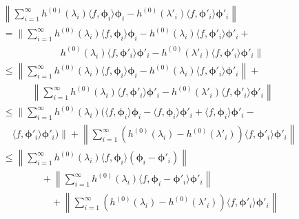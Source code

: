 \begin{align}
 & \nonumber \left\| \sum_{i=1}^\infty h^{(0)}(\lambda_{i}) \langle f, \bm\phi_i \rangle \bm\phi_i  -  h^{(0)}(\lambda'_i )  \langle f, \bm\phi'_i \rangle \bm\phi'_i \right\|  \\
 &\nonumber =\Bigg\|\sum_{i=1}^\infty  h^{(0)}(\lambda_{i}) \langle f, \bm\phi_i \rangle \bm\phi_i -  h^{(0)}(\lambda_{i}) \langle f, \bm\phi'_i \rangle \bm\phi'_i  + \\
 &\qquad \qquad \qquad h^{(0)}(\lambda_{i}) \langle f, \bm\phi'_i \rangle \bm\phi'_i- h^{(0)}(\lambda'_{i}) \langle f, \bm\phi'_i \rangle \bm\phi'_i \Bigg\| \\
  & \nonumber \leq \left\|\sum_{i=1}^\infty  h^{(0)}(\lambda_i)  \langle f, \bm\phi_i \rangle \bm\phi_i -  h^{(0)}(\lambda_i ) \langle f, \bm\phi'_i \rangle \bm\phi'_i\right\|  +\\
  &\qquad\quad  \left\|\sum_{i =1}^\infty h^{(0)}(\lambda_{i}) \langle f, \bm\phi'_i \rangle \bm\phi'_i -  h^{(0)}(\lambda'_{i}) \langle f, \bm\phi'_i \rangle \bm\phi'_i \right\| \\
    &\nonumber \leq \Bigg\| \sum_{i=1}^\infty  h^{(0)}(\lambda_i)\Bigg( \langle f, \bm\phi_i \rangle\bm\phi_i-\langle f, \bm\phi_i \rangle\bm\phi'_i +\langle f, \bm\phi_i \rangle\bm\phi'_i - \\
    &\quad \langle f, \bm\phi'_i \rangle \bm\phi'_i \Bigg) \Bigg\| +\left\|\sum_{i =1}^\infty  (h^{(0)}(\lambda_i ) -h^{(0)}(\lambda'_i) ) \langle f, \bm\phi'_i \rangle \bm\phi'_i  \right\| \\
    & \nonumber \leq \left\| \sum_{i=1}^\infty h^{(0)}(\lambda_i )\langle f, \bm\phi_i \rangle (\bm\phi_i - \bm\phi'_i ) \right\| \\\nonumber &\qquad \qquad  +\left\|  \sum_{i =1}^\infty  h^{(0)}(\lambda_i )\langle f, \bm\phi_i - \bm\phi'_i  \rangle \bm\phi'_i \right\|\\
      &\qquad \qquad \quad 
     + \left\|\sum_{i=1}^\infty  (h^{(0)}(\lambda_i ) -h^{(0)}(\lambda'_i) ) \langle f, \bm\phi'_i \rangle \bm\phi'_i  \right\| \label{eqn:3}
\end{align}

